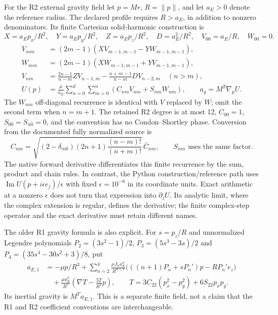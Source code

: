 For the R2 external gravity field let $p=Mr$, $R=\|p\|$, and let $a_E>0$ denote
the reference radius. The declared profile requires $R>a_E$, in addition to
nonzero denominators. Its finite Cartesian solid-harmonic construction is
\begin{equation}
 X=a_Ep_x/R^2,\quad Y=a_Ep_y/R^2,\quad Z=a_Ep_z/R^2,\quad D=a_E^2/R^2,
 \quad V_{00}=a_E/R,\quad W_{00}=0.
\end{equation}
\begin{align}
 V_{mm}&=(2m-1)(XV_{m-1,m-1}-YW_{m-1,m-1}),\\
 W_{mm}&=(2m-1)(XW_{m-1,m-1}+YV_{m-1,m-1}),\\
 V_{nm}&=\frac{2n-1}{n-m}ZV_{n-1,m}
       -\frac{n+m-1}{n-m}DV_{n-2,m}\quad(n>m),\\
 U(p)&=\frac{\mu}{a_E}\sum_{n=0}^{d}\sum_{m=0}^{n}
       (C_{nm}V_{nm}+S_{nm}W_{nm}),\qquad a_g=M^T\nabla_pU.
\end{align}
The $W_{nm}$ off-diagonal recurrence is identical with $V$ replaced by $W$; omit
the second term when $n=m+1$. The retained R2 degree is at most 12, $C_{00}=1$,
$S_{00}=S_{n0}=0$, and the convention has no Condon--Shortley phase. Conversion
from the documented fully normalized source is
\begin{equation}
 C_{nm}=\sqrt{(2-\delta_{m0})(2n+1)\frac{(n-m)!}{(n+m)!}}\,\bar C_{nm},
 \qquad S_{nm}\text{ uses the same factor}.
\end{equation}
The native forward derivative differentiates this finite recurrence by the sum,
product and chain rules. In contrast, the Python construction/reference path
uses $\operatorname{Im}U(p+i\epsilon e_j)/\epsilon$ with fixed
$\epsilon=10^{-6}$ in its coordinate units. Exact arithmetic at a nonzero
$\epsilon$ does not turn that expression into $\partial_jU$. Its analytic
limit, where the complex extension is regular, defines the derivative; the
finite complex-step operator and the exact derivative must retain different names.

The older R1 gravity formula is also explicit. For $s=p_z/R$ and unnormalized
Legendre polynomials
$P_2=(3s^2-1)/2$, $P_3=(5s^3-3s)/2$ and
$P_4=(35s^4-30s^2+3)/8$, put
\begin{align}
 a_{E,1}&=-\mu p/R^3+
 \sum_{n=2}^{4}\frac{\mu J_na_E^n}{R^{n+3}}
 \bigl(((n+1)P_n+sP_n')p-RP_n'e_z\bigr)\\
 &\quad+\frac{\mu a_E^2}{R^5}
       \left(\nabla T-\frac{5T}{R^2}p\right),\qquad
 T=3C_{22}(p_x^2-p_y^2)+6S_{22}p_xp_y.
\end{align}
Its inertial gravity is $M^Ta_{E,1}$. This is a separate finite field, not a
claim that the R1 and R2 coefficient conventions are interchangeable.

